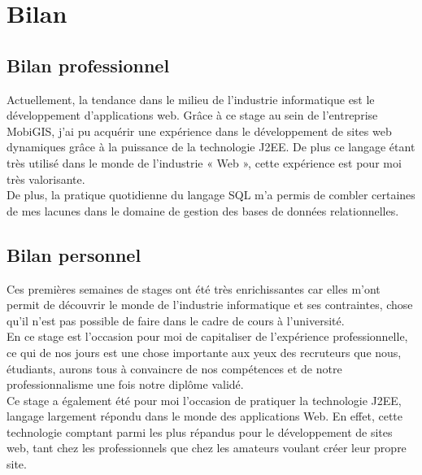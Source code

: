 \chapter{Bilan}
\label{Bilan}


\section{Bilan professionnel}

Actuellement, la tendance dans le milieu de l’industrie informatique est le développement d’applications web. Grâce à ce stage au sein de l’entreprise MobiGIS, j’ai pu acquérir une expérience dans le développement de sites web dynamiques grâce à la puissance de la technologie J2EE. De plus ce langage étant très utilisé dans le monde de l’industrie « Web », cette expérience est pour moi très valorisante.\\
De plus, la pratique quotidienne du langage SQL m’a permis de combler certaines de mes lacunes dans le domaine de gestion des bases de données relationnelles.\\

\section{Bilan personnel}

Ces premières semaines de stages ont été très enrichissantes car elles m’ont permit de découvrir le monde de l’industrie informatique et ses contraintes, chose qu’il n’est pas possible de faire dans le cadre de cours à l’université.\\

En ce stage est l’occasion pour moi de capitaliser de l’expérience professionnelle, ce qui de nos jours est une chose importante aux yeux des recruteurs que nous, étudiants, aurons tous à convaincre de nos compétences et de notre professionnalisme une fois notre diplôme validé.\\

Ce stage a également été pour moi l’occasion de pratiquer la technologie J2EE, langage largement répondu dans le monde des applications Web. En effet, cette technologie comptant parmi les plus répandus pour le développement de sites web, tant chez les professionnels que chez les amateurs voulant créer leur propre site.\\